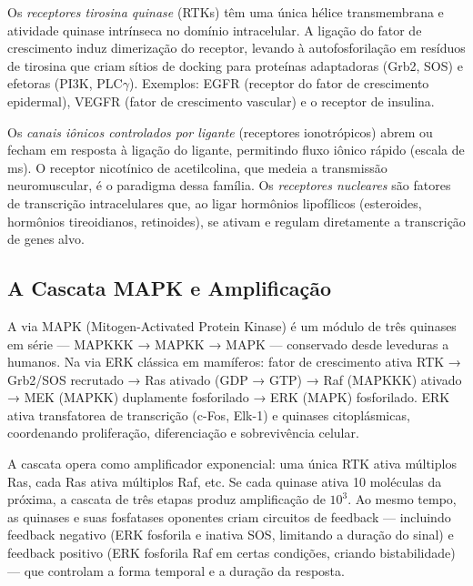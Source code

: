 Os \emph{receptores tirosina quinase} (RTKs) têm uma única hélice transmembrana e
atividade quinase intrínseca no domínio intracelular. A ligação do fator de crescimento
induz dimerização do receptor, levando à autofosforilação em resíduos de tirosina que
criam sítios de docking para proteínas adaptadoras (Grb2, SOS) e efetoras (PI3K, PLC$\gamma$).
Exemplos: EGFR (receptor do fator de crescimento epidermal), VEGFR (fator de crescimento
vascular) e o receptor de insulina.

Os \emph{canais iônicos controlados por ligante} (receptores ionotrópicos) abrem ou
fecham em resposta à ligação do ligante, permitindo fluxo iônico rápido (escala de ms).
O receptor nicotínico de acetilcolina, que medeia a transmissão neuromuscular, é o
paradigma dessa família. Os \emph{receptores nucleares} são fatores de transcrição
intracelulares que, ao ligar hormônios lipofílicos (esteroides, hormônios tireoidianos,
retinoides), se ativam e regulam diretamente a transcrição de genes alvo.

\subsection{A Cascata MAPK e Amplificação}

A via MAPK (Mitogen-Activated Protein Kinase) é um módulo de três quinases em série ---
MAPKKK → MAPKK → MAPK --- conservado desde leveduras a humanos. Na via ERK clássica em
mamíferos: fator de crescimento ativa RTK → Grb2/SOS recrutado → Ras ativado (GDP → GTP)
→ Raf (MAPKKK) ativado → MEK (MAPKK) duplamente fosforilado → ERK (MAPK) fosforilado.
ERK ativa transfatorea de transcrição (c-Fos, Elk-1) e quinases citoplásmicas,
coordenando proliferação, diferenciação e sobrevivência celular.

A cascata opera como amplificador exponencial: uma única RTK ativa múltiplos Ras, cada
Ras ativa múltiplos Raf, etc. Se cada quinase ativa 10 moléculas da próxima, a cascata
de três etapas produz amplificação de $10^3$. Ao mesmo tempo, as quinases e suas
fosfatases oponentes criam circuitos de feedback --- incluindo feedback negativo (ERK
fosforila e inativa SOS, limitando a duração do sinal) e feedback positivo (ERK
fosforila Raf em certas condições, criando bistabilidade) --- que controlam a forma
temporal e a duração da resposta.

